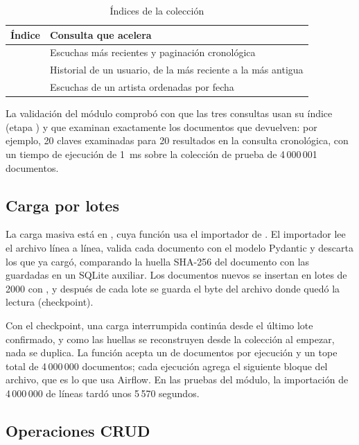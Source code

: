 \begin{table}[H]
\centering
\caption{Índices de la colección }
\label{tab:mongo-indices}
\begin{tabularx}{\textwidth}{l Y}
\toprule
Índice & Consulta que acelera \\
\midrule
{} & Escuchas más recientes y paginación cronológica \\
 & Historial de un usuario, de la más reciente a la más antigua \\
 & Escuchas de un artista ordenadas por fecha \\
\bottomrule
\end{tabularx}
\end{table}

La validación del módulo comprobó con  que las tres consultas usan su índice (etapa ) y que examinan exactamente los documentos que devuelven: por ejemplo, 20 claves examinadas para 20 resultados en la consulta cronológica, con un tiempo de ejecución de 1~ms sobre la colección de prueba de 4\,000\,001 documentos.

\subsection{Carga por lotes}

La carga masiva está en , cuya función  usa el importador de . El importador lee el archivo línea a línea, valida cada documento con el modelo Pydantic  y descarta los que ya cargó, comparando la huella SHA-256 del documento con las guardadas en un SQLite auxiliar. Los documentos nuevos se insertan en lotes de 2000 con , y después de cada lote se guarda el byte del archivo donde quedó la lectura (checkpoint).

Con el checkpoint, una carga interrumpida continúa desde el último lote confirmado, y como las huellas se reconstruyen desde la colección al empezar, nada se duplica. La función acepta un  de documentos por ejecución y un tope total de 4\,000\,000 documentos; cada ejecución agrega el siguiente bloque del archivo, que es lo que usa Airflow. En las pruebas del módulo, la importación de 4\,000\,000 de líneas tardó unos 5\,570 segundos.

\subsection{Operaciones CRUD}

